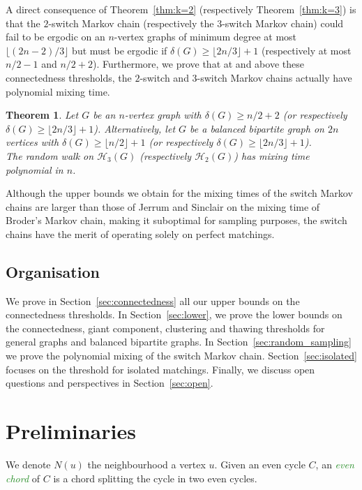\documentclass[11pt,a4paper]{article}
\newtheorem{theorem}{Theorem}[section]
\theoremstyle{definition}
\newcommand{\defin}[1]{\emph{\textcolor{ForestGreen}{#1}}}
\begin{document}
A direct consequence of Theorem~\ref{thm:k=2} (respectively Theorem~\ref{thm:k=3}) is that the
$2$-switch Markov chain (respectively the $3$-switch Markov chain) could fail to be
ergodic on an $n$-vertex graphs of minimum degree at most $\lfloor (2n-2)/3
\rfloor$ but must be ergodic if $\delta(G) \ge \lfloor 2n/3
\rfloor+1$ (respectively at most $n/2-1$ and $n/2+2$). Furthermore, we prove that at and
above these connectedness thresholds, the $2$-switch and $3$-switch Markov chains
actually have polynomial mixing time.
\begin{theorem}\label{thm:mixing23}
  Let $G$ be an $n$-vertex graph with $\delta(G) \ge n/2+2$ (or respectively
  $\delta(G) \ge \lfloor 2n/3 \rfloor+1$). Alternatively, let $G$ be a
  balanced bipartite graph on $2n$ vertices with
  $\delta(G) \ge \lfloor n/2\rfloor+1 $ (or respectively
  $\delta(G) \ge \lfloor 2n/3 \rfloor+1$).\\
  The random walk on $\mathcal H_3(G)$ (respectively $\mathcal H_2(G)$) has mixing time polynomial
  in $n$.
\end{theorem}

Although the upper bounds we obtain for the mixing times of the switch Markov chains
are larger than those of Jerrum and Sinclair on the mixing time of
Broder's Markov chain, making it suboptimal for sampling purposes, the switch chains have the merit of operating solely on perfect matchings.

\subsection{Organisation}

We prove in Section~\ref{sec:connectedness} all our upper bounds on the connectedness
thresholds. In Section~\ref{sec:lower}, we prove the lower bounds on the connectedness,
giant component, clustering and thawing thresholds for general graphs and
balanced bipartite graphs.  In Section~\ref{sec:random_sampling} we prove the
polynomial mixing of the switch Markov chain. Section~\ref{sec:isolated} focuses on the
threshold for isolated matchings. Finally, we discuss open questions and
perspectives in Section~\ref{sec:open}.


  
\section{Preliminaries}
We denote $N(u)$ the neighbourhood a vertex $u$.
Given an even cycle $C$, an \defin{even chord} of $C$ is a chord splitting the
cycle in two even cycles.
\end{document}
